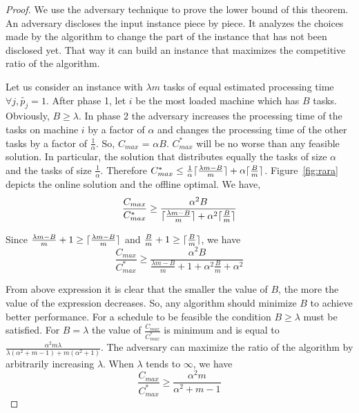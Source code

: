 \documentclass[10pt, conference, compsocconf]{IEEEtran}
\DeclarePairedDelimiter{\ceil}{\lceil}{\rceil}
\begin{document}
\begin{proof}
  We use the adversary technique to prove the lower bound of this
  theorem. An adversary discloses the input instance piece by
  piece. It analyzes the choices made by the algorithm to change the
  part of the instance that has not been disclosed yet. That way it
  can build an instance that maximizes the competitive ratio of the
  algorithm.
 
  Let us consider an instance with $\lambda m$ tasks of equal
  estimated processing time $\forall j, \tilde{p_j} = 1$. After phase
  1, let $i$ be the most loaded machine which has $B$
  tasks. Obviously, $B \geq \lambda$. In phase 2 the adversary
  increases the processing time of the tasks on machine $i$ by a
  factor of $\alpha$ and changes the processing time of the other
  tasks by a factor of $\frac{1}{\alpha}$. So, $ C_{max}$ = $\alpha
  B$. ${C^{*}_{max}}$ will be no worse than any feasible solution. In
  particular, the solution that distributes equally the tasks of size
  $\alpha$ and the tasks of size $\frac{1}{\alpha}$. Therefore
  ${C^{*}_{max}} \leq \frac{1}{\alpha }\ceil {\frac{\lambda m - B
    }{m}}+ \alpha\ceil{\frac{B}{m}} $.  Figure~\ref{fig:rara} depicts
  the online solution and the offline optimal. We have,
 \begin{equation}\nonumber
   \frac{C_{max}}{C^{*}_{max}}
   \geq \frac{\alpha^{2} B  }{\ceil{\frac{
        \lambda m - B }{m}}+\alpha^2\ceil{\frac{B}{m}}}
 \end{equation}
   
 Since $\frac{ \lambda m - B }{m} +1 \geq\ceil{\frac{ \lambda m - B
   }{m}}$ and $\frac{B}{m}+1\geq\ceil{\frac{B}{m}}$, we have
 \begin{equation}\nonumber
   \frac{C_{max}}{C^{*}_{max}}
   \geq \frac{\alpha^{2} B  }{\frac{
       \lambda m - B }{m}+1+\alpha^2\frac{B}{m}+\alpha^{2}}
 \end{equation}
 
 From above expression it is clear that the smaller the value of $B$, the more the
 value of the expression decreases. So, any algorithm should minimize
 $B$ to achieve better performance.  For a schedule to be feasible the
 condition $B \geq \lambda$ must be satisfied. For $B = \lambda$ the
 value of $\frac{C_{max}}{C^{*}_{max}}$ is minimum and is equal to
 $\frac{\alpha^{2} m \lambda }{\lambda(\alpha^{2}+m-1)+
   m(\alpha^{2}+1)}$. The adversary can maximize the ratio of the
 algorithm by arbitrarily increasing $\lambda$. When $\lambda$ tends
 to $\infty$, we have
 \begin{equation}\nonumber
       \frac{C_{max}}{C^{*}_{max}}
       \geq \frac{\alpha^{2}m  }{\alpha^{2}+m-1}
     \end{equation}
 


\end{proof}
\end{document}
